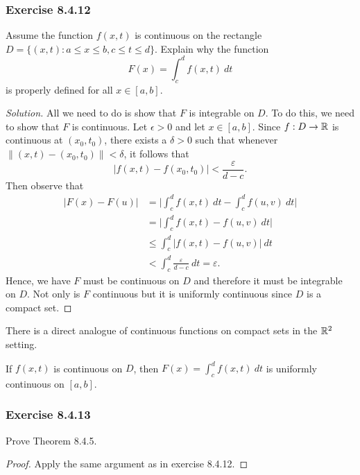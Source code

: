 \subsubsection{Exercise 8.4.12} Assume the function \( f(x,t)  \) is continuous on the rectangle \( D = \{ (x,t) : a \leq x \leq b , c \leq t \leq d  \}. \) Explain why the function
\[  F(x) = \int_{ c }^{ d } f(x,t) \ dt \] is properly defined for all \( x \in [a,b]  \).
\begin{proof}[Solution]
    All we need to do is show that \( F \) is integrable on \( D  \). To do this, we need to show that \( F  \) is continuous. Let \( \epsilon > 0  \) and let \( x \in [a,b] \). Since \( f: D \to \mathbb{R}   \) is continuous at \( (x_{0}, t_{0}) \), there exists a \( \delta > 0 \) such that whenever \( \lVert (x,t) - (x_{0}, t_{0}) \rVert <  \delta  \), it follows that 
\[ | f(x,t) - f(x_{0}, t_{0}) | < \frac{ \varepsilon }{  d - c  } .  \] 
Then observe that 
\begin{align*}
    | F(x) - F(u)  | &= \Big| \int_{ c }^{ d } f(x,t) \ dt - \int_{ c }^{ d } f(u,v) \  dt \Big|   \\
                     &= \Big| \int_{ c }^{ d } f(x,t) - f(u,v) \ dt \Big| \\
                     &\leq \int_{ c }^{ d }  | f(x,t) - f(u,v) | \  dt \\
                     &< \int_{ c }^{ d }  \frac{ \varepsilon }{ d -c  } \  dt 
                     = \varepsilon.
\end{align*}
Hence, we have \( F  \) must be continuous on \( D  \) and therefore it must be integrable on \( D  \). Not only is \( F  \) continuous but it is uniformly continuous since \( D  \) is a compact set.
\end{proof}

There is a direct analogue of continuous functions on compact sets in the \( \mathbb{R}^{2} \) setting.

\begin{theorem}{}{}
    If \( f(x,t)  \) is continuous on \( D  \), then \( F(x) = \int_{ c }^{ d } f(x,t) \ dt \) is uniformly continuous on \( [a,b]  \).
\end{theorem}

\subsubsection{Exercise 8.4.13} Prove Theorem 8.4.5. 

\begin{proof}
Apply the same argument as in exercise 8.4.12.
\end{proof}

